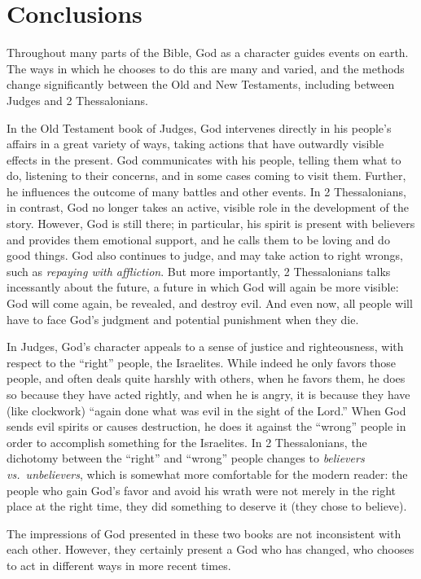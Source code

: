 \documentclass{article}
\begin{document}
\section{Conclusions}
\large
{}

Throughout many parts of the Bible, God as a character guides events on earth. The ways in which he chooses to do this are many and varied, and the methods change significantly between the Old and New Testaments, including between Judges and 2 Thessalonians.

In the Old Testament book of Judges, God intervenes directly in his people's affairs in a great variety of ways, taking actions that have outwardly visible effects in the present. God communicates with his people, telling them what to do, listening to their concerns, and in some cases coming to visit them. Further, he influences the outcome of many battles and other events. In 2 Thessalonians, in contrast, God no longer takes an active, visible role in the development of the story. However, God is still there; in particular, his spirit is present with believers and provides them emotional support, and he calls them to be loving and do good things. God also continues to judge, and may take action to right wrongs, such as \emph{repaying with affliction}. But more importantly, 2 Thessalonians talks incessantly about the future, a future in which God will again be more visible: God will come again, be revealed, and destroy evil. And even now, all people will have to face God's judgment and potential punishment when they die.

In Judges, God's character appeals to a sense of justice and righteousness, with respect to the ``right'' people, the Israelites. While indeed he only favors those people, and often deals quite harshly with others, when he favors them, he does so because they have acted rightly, and when he is angry, it is because they have (like clockwork) ``again done what was evil in the sight of the Lord.'' When God sends evil spirits or causes destruction, he does it against the ``wrong'' people in order to accomplish something for the Israelites. In 2 Thessalonians, the dichotomy between the ``right'' and ``wrong'' people changes to \emph{believers vs.\ unbelievers}, which is somewhat more comfortable for the modern reader: the people who gain God's favor and avoid his wrath were not merely in the right place at the right time, they did something to deserve it (they chose to believe).

The impressions of God presented in these two books are not inconsistent with each other. However, they certainly present a God who has changed, who chooses to act in different ways in more recent times.
\end{document}
